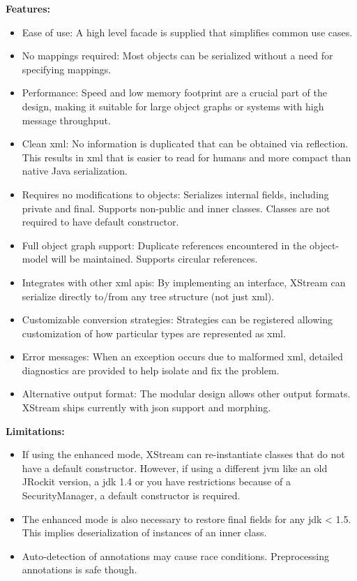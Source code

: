\textbf{Features:}
\begin{itemize}
\item{}Ease of use: A high level facade is supplied that simplifies common use cases.
\item{}No mappings required: Most objects can be serialized without a need for specifying mappings.
\item{}Performance: Speed and low memory footprint are a crucial part of the design, making it suitable for large object graphs or systems with high message throughput.
\item{}Clean \gls{xml}: No information is duplicated that can be obtained via reflection. This results in \gls{xml} that is easier to read for humans and more compact than native Java serialization.
\item{}Requires no modifications to objects: Serializes internal fields, including private and final. Supports non-public and inner classes. Classes are not required to have default constructor.
\item{}Full object graph support: Duplicate references encountered in the object-model will be maintained. Supports circular references.
\item{}Integrates with other \gls{xml} \gls{api}s: By implementing an interface, XStream can serialize directly to/from any tree structure (not just \gls{xml}).
\item{}Customizable conversion strategies: Strategies can be registered allowing customization of how particular types are represented as \gls{xml}.
\item{}Error messages: When an exception occurs due to malformed \gls{xml}, detailed diagnostics are provided to help isolate and fix the problem.
\item{}Alternative output format: The modular design allows other output formats. XStream ships currently with \gls{json} support and morphing.
\end{itemize}

\textbf{Limitations:}
\begin{itemize}
\item{}If using the enhanced mode, XStream can re-instantiate classes that do not have a default constructor. However, if using a different \gls{jvm} like an old JRockit version, a \gls{jdk} 1.4 or you have restrictions because of a SecurityManager, a default constructor is required.
\item{}The enhanced mode is also necessary to restore final fields for any \gls{jdk} < 1.5. This implies deserialization of instances of an inner class.
\item{}Auto-detection of annotations may cause race conditions. Preprocessing annotations is safe though.
\end{itemize}